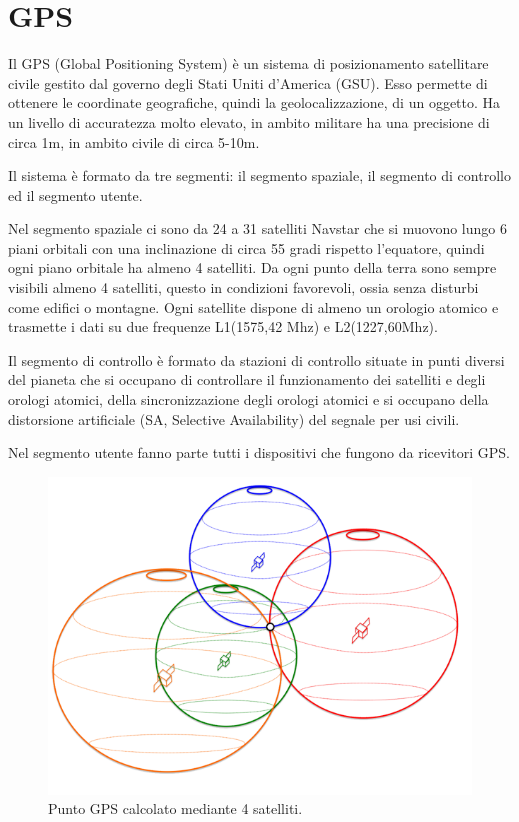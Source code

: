 \documentclass[12pt,a4paper,openright,twoside]{report}
\begin{document}
\section{GPS}
Il GPS (Global Positioning System) è un sistema di posizionamento satellitare civile gestito dal governo degli Stati Uniti d'America (GSU). Esso permette di ottenere le coordinate geografiche, quindi la geolocalizzazione, di un oggetto.
Ha un livello di accuratezza molto elevato, in ambito militare ha una precisione di circa 1m, in ambito civile di circa 5-10m.

Il sistema è formato da tre segmenti: il segmento spaziale, il segmento di controllo ed il segmento utente. \cite{K16}


Nel segmento spaziale ci sono da 24 a 31 satelliti Navstar che si muovono lungo 6 piani orbitali con una inclinazione di circa 55 gradi rispetto l'equatore, quindi ogni piano orbitale ha almeno 4 satelliti. Da ogni punto della terra sono sempre visibili almeno 4 satelliti, questo in condizioni favorevoli, ossia senza disturbi come edifici o montagne. Ogni satellite dispone di almeno un orologio atomico e trasmette i dati su due frequenze L1(1575,42 Mhz) e L2(1227,60Mhz).


Il segmento di controllo è formato da stazioni di controllo situate in punti diversi del pianeta che si occupano di controllare il funzionamento dei satelliti e degli orologi atomici, della sincronizzazione degli orologi atomici e si occupano della distorsione artificiale (SA, Selective Availability) del segnale per usi civili.


Nel segmento utente fanno parte tutti i dispositivi che fungono da ricevitori GPS.
\begin{figure}[h!]
\centering 
\includegraphics[scale=0.6]{fig8} 
\caption{Punto GPS calcolato mediante 4 satelliti.} 
\end{figure}
\end{document}
